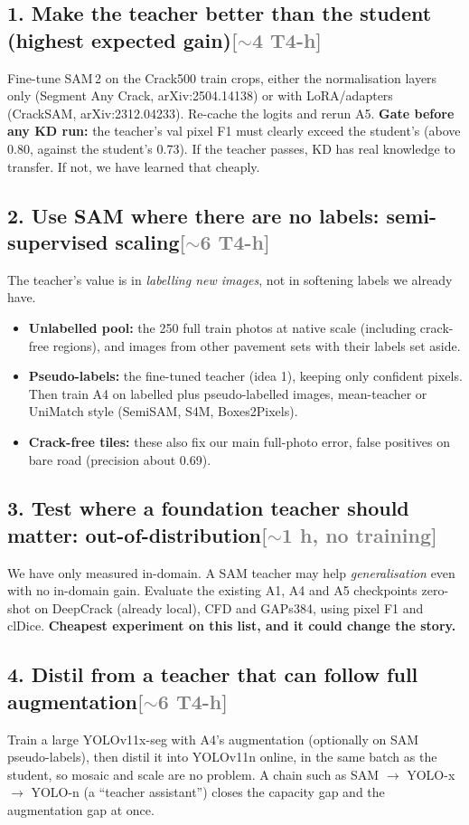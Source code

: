 \documentclass[11pt,a4paper]{article}
\newcommand{\cost}[1]{\hfill\textcolor{gray}{\small[#1]}}
\begin{document}
\subsection*{1. Make the teacher better than the student (highest expected gain)\cost{$\sim$4 T4-h}}
Fine-tune SAM\,2 on the Crack500 train crops, either the normalisation layers only (Segment Any Crack, arXiv:2504.14138)
or with LoRA/adapters (CrackSAM, arXiv:2312.04233). Re-cache the logits and rerun A5.
\textbf{Gate before any KD run:} the teacher's val pixel F1 must clearly exceed the student's (above 0.80, against the student's 0.73).
If the teacher passes, KD has real knowledge to transfer. If not, we have learned that cheaply.

\subsection*{2. Use SAM where there are no labels: semi-supervised scaling\cost{$\sim$6 T4-h}}
The teacher's value is in \emph{labelling new images}, not in softening labels we already have.
\begin{itemize}
\item \textbf{Unlabelled pool:} the 250 full train photos at native scale (including crack-free regions), and images from other
pavement sets with their labels set aside.
\item \textbf{Pseudo-labels:} the fine-tuned teacher (idea 1), keeping only confident pixels. Then train A4 on labelled plus pseudo-labelled
images, mean-teacher or UniMatch style (SemiSAM, S4M, Boxes2Pixels).
\item \textbf{Crack-free tiles:} these also fix our main full-photo error, false positives on bare road (precision about 0.69).
\end{itemize}

\subsection*{3. Test where a foundation teacher should matter: out-of-distribution\cost{$\sim$1 h, no training}}
We have only measured in-domain. A SAM teacher may help \emph{generalisation} even with no in-domain gain.
Evaluate the existing A1, A4 and A5 checkpoints zero-shot on DeepCrack (already local), CFD and GAPs384, using pixel F1 and clDice.
\textbf{Cheapest experiment on this list, and it could change the story.}

\subsection*{4. Distil from a teacher that can follow full augmentation\cost{$\sim$6 T4-h}}
Train a large YOLOv11x-seg with A4's augmentation (optionally on SAM pseudo-labels), then distil it into YOLOv11n online,
in the same batch as the student, so mosaic and scale are no problem.
A chain such as SAM $\rightarrow$ YOLO-x $\rightarrow$ YOLO-n (a ``teacher assistant'') closes the capacity gap and the augmentation gap at once.
\end{document}
